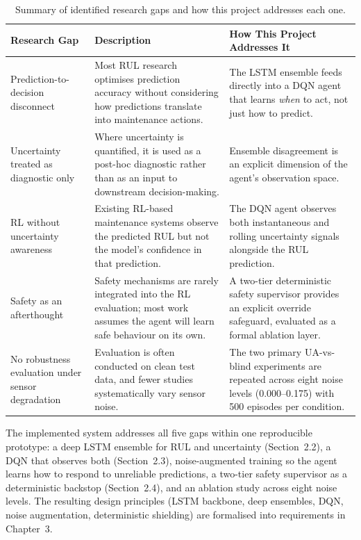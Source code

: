 \documentclass[12pt,a4paper]{report}
\begin{document}
\begin{table}[h]
\centering
\caption{Summary of identified research gaps and how this project addresses each one.}
\label{tab:lit_gaps}
\renewcommand{\arraystretch}{1.4}
\begin{tabular}{>{\raggedright\arraybackslash}p{3.2cm} >{\raggedright\arraybackslash}p{5.8cm} >{\raggedright\arraybackslash}p{4.5cm}}
\toprule
\textbf{Research Gap} & \textbf{Description} & \textbf{How This Project Addresses It} \\
\midrule
Prediction-to-decision disconnect & Most RUL research optimises prediction accuracy without considering how predictions translate into maintenance actions. & The LSTM ensemble feeds directly into a DQN agent that learns \emph{when} to act, not just how to predict. \\
\addlinespace
Uncertainty treated as diagnostic only & Where uncertainty is quantified, it is used as a post-hoc diagnostic rather than as an input to downstream decision-making. & Ensemble disagreement is an explicit dimension of the agent's observation space. \\
\addlinespace
RL without uncertainty awareness & Existing RL-based maintenance systems observe the predicted RUL but not the model's confidence in that prediction. & The DQN agent observes both instantaneous and rolling uncertainty signals alongside the RUL prediction. \\
\addlinespace
Safety as an afterthought & Safety mechanisms are rarely integrated into the RL evaluation; most work assumes the agent will learn safe behaviour on its own. & A two-tier deterministic safety supervisor provides an explicit override safeguard, evaluated as a formal ablation layer. \\
\addlinespace
No robustness evaluation under sensor degradation & Evaluation is often conducted on clean test data, and fewer studies systematically vary sensor noise. & The two primary UA-vs-blind experiments are repeated across eight noise levels (0.000--0.175) with 500 episodes per condition. \\
\bottomrule
\end{tabular}
\end{table}


The implemented system addresses all five gaps within one reproducible prototype: a deep LSTM ensemble for RUL and uncertainty (Section~2.2), a DQN that observes both (Section~2.3), noise-augmented training so the agent learns how to respond to unreliable predictions, a two-tier safety supervisor as a deterministic backstop (Section~2.4), and an ablation study across eight noise levels. The resulting design principles (LSTM backbone, deep ensembles, DQN, noise augmentation, deterministic shielding) are formalised into requirements in Chapter~3.
\end{document}
